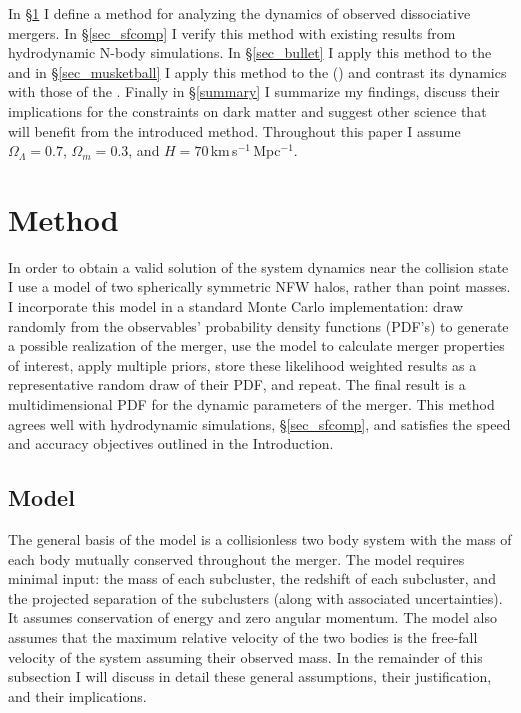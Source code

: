 \documentclass[12pt]{emulateapj}
\begin{document}

In \S\ref{sec_method} I define a method for analyzing the dynamics of observed dissociative mergers.
In \S\ref{sec_sfcomp} I verify this method with existing results from hydrodynamic N-body simulations.
In \S\ref{sec_bullet} I apply this method to the  and in \S\ref{sec_musketball} I apply this method to the  () and contrast its dynamics with those of the .
Finally in \S \ref{summary} I summarize my findings, discuss their implications for the constraints on dark matter and suggest other science that will benefit from the introduced method.
Throughout this paper I assume $\Omega_{\Lambda}=0.7$, $\Omega_m=0.3$, and $H=70$\,km\,s$^{-1}$\,Mpc$^{-1}$.




\section{Method}\label{sec_method}

In order to obtain a valid solution of the system dynamics near the collision state I use a model of two spherically symmetric NFW halos, rather than point masses.
I incorporate this model in a standard Monte Carlo implementation: draw randomly from the observables' probability density functions (PDF's) to generate a possible realization of the merger, use the model to calculate merger properties of interest, apply multiple priors, store these likelihood weighted results as a representative random draw of their PDF, and repeat.  
The final result is a multidimensional PDF for the dynamic parameters of the merger. 
This method agrees well with hydrodynamic simulations, \S\ref{sec_sfcomp}, and satisfies the speed and accuracy objectives outlined in the Introduction.

\subsection{Model}\label{sec_model}
The general basis of the model is a collisionless two body system with the mass of each body mutually conserved throughout the merger.
The model requires minimal input: the mass of each subcluster, the redshift of each subcluster, and the projected separation of the subclusters (along with associated uncertainties).
It assumes conservation of energy and zero angular momentum.
The model also assumes that the maximum relative velocity of the two bodies is the free-fall velocity of the system assuming their observed mass.
In the remainder of this subsection I will discuss in detail these general assumptions, their justification, and their implications. 
\end{document}

